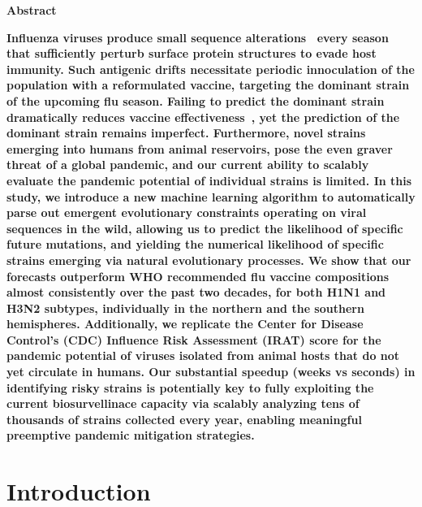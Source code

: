 \documentclass[onecolumn, compsoc,10pt]{IEEEtran}
\begin{document}
  
 
\maketitle

 
\begin{center}
    \textbf{Abstract}
\end{center}

  {\bf \sffamily \fontsize{10}{12}\selectfont \noindent   
Influenza viruses produce  small sequence alterations~\cite{dos2016influenza} every season  that sufficiently perturb surface protein structures to evade host immunity. Such antigenic drifts necessitate periodic innoculation of the population with a  reformulated  vaccine,  targeting the  dominant  strain of the upcoming flu season.  Failing to predict the dominant strain  dramatically reduces  vaccine effectiveness~\cite{tricco2013comparing}, yet the prediction of the dominant strain remains imperfect. Furthermore, novel strains emerging into humans from animal reservoirs,  pose the even graver threat of a global  pandemic, and our current ability to  scalably  evaluate the pandemic potential of   individual strains  is limited. In this study, we introduce a new machine learning algorithm to automatically parse out emergent evolutionary constraints operating on viral sequences in the wild, allowing us to predict the likelihood of specific future  mutations, and  yielding the  numerical likelihood of specific  strains emerging via natural evolutionary processes. We show that our forecasts  outperform WHO recommended flu vaccine compositions almost consistently over the past two decades, for both H1N1 and H3N2 subtypes, individually in the northern and the southern hemispheres. Additionally, we replicate the  Center for Disease Control's (CDC) Influence Risk Assessment (IRAT) score for the pandemic potential of  \infl  viruses isolated from animal hosts that do not yet circulate in humans. Our  substantial speedup (weeks vs seconds) in  identifying risky strains is potentially key to fully exploiting the  current biosurvellinace capacity via scalably analyzing tens of thousands of strains collected every year, enabling  meaningful preemptive pandemic mitigation strategies. 
}

\vspace{10pt}
\section*{Introduction}
\end{document}
